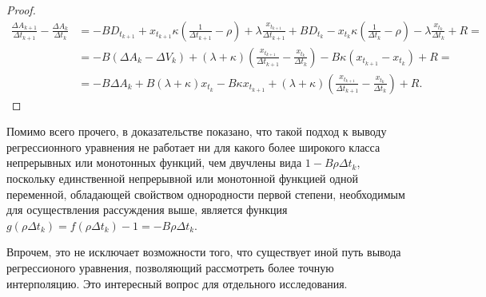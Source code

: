 \begin{appendices}
\begin{proof}
\begin{align*}
                        \frac{\Delta A_{k+1}}{\Delta t_{k+1}} - \frac{\Delta A_{k}}{\Delta t_{k}} &=
                        - B D_{t_{k+1}} + x_{t_{k+1}} \kappa \left(\frac{1}{\Delta t_{k+1}} - \rho \right) + \lambda \frac{x_{t_{k+1}}}{\Delta t_{k+1}}
                        + B D_{t_{k}}   - x_{t_{k}}   \kappa \left(\frac{1}{\Delta t_{k}} - \rho \right)   - \lambda \frac{x_{t_k}}    {\Delta t_{k}} 
                        + R = \\
                        &= -B (\Delta A_k - \Delta V_k) + (\lambda + \kappa) \left(\frac{x_{t_{k+1}}}{\Delta t_{k+1}} - \frac{x_{t_k}}{\Delta t_{k}}\right) 
                        - B \kappa (x_{t_{k+1}} - x_{t_{k}}) + R = \\
                        &= -B \Delta A_k + B (\lambda + \kappa) x_{t_k} - B \kappa x_{t_{k+1}} 
                        + (\lambda + \kappa) \left(\frac{x_{t_{k+1}}}{\Delta t_{k+1}} - \frac{x_{t_k}}{\Delta t_{k}}\right) + R.
                \end{align*} 

        \end{proof}
        \par
        Помимо всего прочего, в доказательстве показано, что такой подход к выводу регрессионного уравнения 
        не работает ни для какого более широкого класса непрерывных или монотонных функций, чем двучлены вида 
        $1 - B \rho \Delta t_k$,
        поскольку единственной непрерывной или монотонной функцией одной переменной, обладающей свойством
        однородности первой степени, необходимым для осуществления рассуждения выше, является функция 
        $g(\rho \Delta t_k) = f(\rho \Delta t_k) - 1 = - B \rho \Delta t_k $. 
        \par
        Впрочем, это не исключает возможности того, что существует иной путь вывода регрессионого уравнения,
        позволяющий рассмотреть более точную интерполяцию. Это интересный вопрос для отдельного исследования.  
        

\end{appendices}
